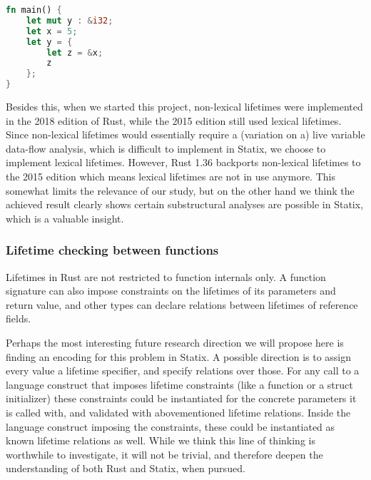 \begin{lstlisting}[language=rust, showstringspaces=false, escapechar=~, label={lst:borrowscope}, caption={Example of returning a borrow}]
fn main() { 
    let mut y : &i32;
    let x = 5; 
    let y = {
        let z = &x;
        z
    };
}
\end{lstlisting}

Besides this, when we started this project, non-lexical lifetimes were implemented in the 2018 edition of Rust, while the 2015 edition still used lexical lifetimes. Since non-lexical lifetimes would essentially require a (variation on a) live variable data-flow analysis, which is difficult to implement in Statix, we choose to implement lexical lifetimes. However, Rust 1.36 backports non-lexical lifetimes to the 2015 edition which means lexical lifetimes are not in use anymore. This somewhat limits the relevance of our study, but on the other hand we think the achieved result clearly shows certain substructural analyses are possible in Statix, which is a valuable insight. 

\subsubsection{Lifetime checking between functions}

Lifetimes in Rust are not restricted to function internals only. A function signature can also impose constraints on the lifetimes of its parameters and return value, and other types can declare relations between lifetimes of reference fields.

Perhaps the most interesting future research direction we will propose here is finding an encoding for this problem in Statix. A possible direction is to assign every value a lifetime specifier, and specify relations over those. For any call to a language construct that imposes lifetime constraints (like a function or a struct initializer) these constraints could be instantiated for the concrete parameters it is called with, and validated with abovementioned lifetime relations. Inside the language construct imposing the constraints, these could be instantiated as known lifetime relations as well. While we think this line of thinking is worthwhile to investigate, it will not be trivial, and therefore deepen the understanding of both Rust and Statix, when pursued.

